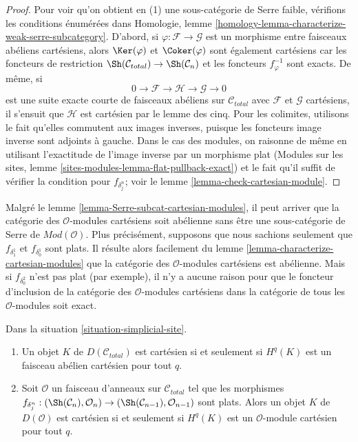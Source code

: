 \begin{proof}
Pour voir qu'on obtient en (1) une sous-catégorie de Serre faible,
vérifions les conditions énumérées dans
Homologie, lemme \ref{homology-lemma-characterize-weak-serre-subcategory}.
D'abord, si $\varphi : \mathcal{F} \to \mathcal{G}$ est un morphisme
entre faisceaux abéliens cartésiens, alors
$\Ker(\varphi)$ et $\Coker(\varphi)$ sont également cartésiens
car les foncteurs de restriction
$\Sh(\mathcal{C}_{total}) \to \Sh(\mathcal{C}_n)$
et les foncteurs $f_\varphi^{-1}$ sont exacts.
De même, si
$$
0 \to \mathcal{F} \to \mathcal{H} \to \mathcal{G} \to 0
$$
est une suite exacte courte de faisceaux abéliens sur $\mathcal{C}_{total}$
avec $\mathcal{F}$ et $\mathcal{G}$ cartésiens, il s'ensuit que
$\mathcal{H}$ est cartésien par le lemme des cinq. Pour les colimites,
utilisons le fait qu'elles commutent aux images inverses, puisque les foncteurs image inverse sont adjoints
à gauche. Dans le cas des modules,
on raisonne de même en utilisant l'exactitude de l'image inverse par un morphisme plat
(Modules sur les sites, lemme \ref{sites-modules-lemma-flat-pullback-exact})
et le fait qu'il suffit de vérifier la condition
pour $f_{\delta^n_j}$; voir le lemme \ref{lemma-check-cartesian-module}.
\end{proof}

\begin{remark}[Avertissement]
\label{remark-warning-cartesian-modules}
Malgré le lemme \ref{lemma-Serre-subcat-cartesian-modules}, il
peut arriver que la catégorie des $\mathcal{O}$-modules cartésiens soit abélienne
sans être une sous-catégorie de Serre de $\textit{Mod}(\mathcal{O})$.
Plus précisément, supposons que nous sachions seulement que
$f_{\delta_1^1}$ et $f_{\delta_0^1}$ sont plats.
Il résulte alors facilement du lemme
\ref{lemma-characterize-cartesian-modules}
que la catégorie des $\mathcal{O}$-modules cartésiens est abélienne.
Mais si $f_{\delta_0^2}$ n'est pas plat (par exemple),
il n'y a aucune raison pour que le foncteur d'inclusion
de la catégorie des $\mathcal{O}$-modules cartésiens
dans la catégorie de tous les $\mathcal{O}$-modules soit exact.
\end{remark}

\begin{lemma}
\label{lemma-derived-cartesian-modules}
Dans la situation \ref{situation-simplicial-site}.
\begin{enumerate}
\item Un objet $K$ de $D(\mathcal{C}_{total})$ est cartésien si et seulement
si $H^q(K)$ est un faisceau abélien cartésien pour tout $q$.
\item Soit $\mathcal{O}$ un faisceau
d'anneaux sur $\mathcal{C}_{total}$ tel que les morphismes
$f_{\delta^n_j} : (\Sh(\mathcal{C}_n), \mathcal{O}_n)
\to (\Sh(\mathcal{C}_{n - 1}), \mathcal{O}_{n - 1})$ sont plats.
Alors un objet $K$ de $D(\mathcal{O})$ est cartésien si et seulement
si $H^q(K)$ est un $\mathcal{O}$-module cartésien pour tout $q$.
\end{enumerate}
\end{lemma}

